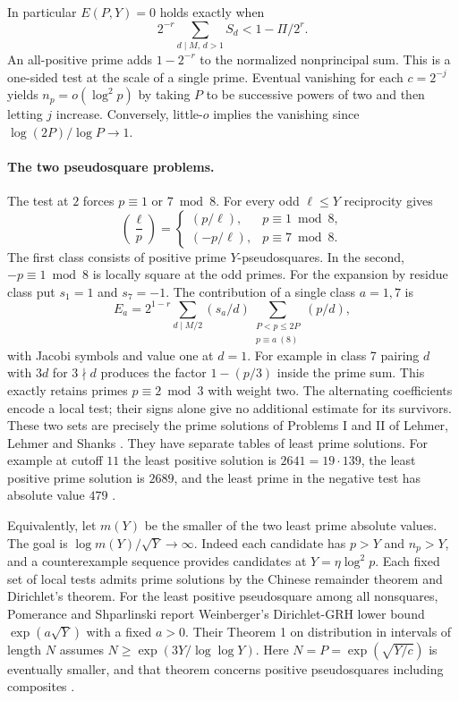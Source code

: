 \documentclass[11pt]{article}
\newcommand{\leg}[2]{\left(\frac{#1}{#2}\right)}
\begin{document}
In particular $E(P,Y)=0$ holds exactly when
\[
 2^{-r}\sum_{d\mid M,\,d>1} S_d < 1-\Pi/2^r .
 \tag{3}
\]
An all-positive prime adds $1-2^{-r}$ to the normalized nonprincipal
sum. This is a one-sided test at the scale of a single prime.
Eventual vanishing for each $c=2^{-j}$ yields $n_p=o(\log^2 p)$
by taking $P$ to be successive powers of two and then letting $j$
increase. Conversely, little-$o$ implies the vanishing since
$\log(2P)/\log P\to1$.

\paragraph{The two pseudosquare problems.}
The test at $2$ forces $p\equiv1$ or $7\bmod 8$. For every odd
$\ell\le Y$ reciprocity gives
\[
 \leg{\ell}{p}=\begin{cases}
 (p/\ell),&p\equiv1\bmod8,\\
 (-p/\ell),&p\equiv7\bmod8 .
 \end{cases}
\]
The first class consists of positive prime $Y$-pseudosquares. In
the second, $-p\equiv1\bmod8$ is locally square at the odd primes.
For the expansion by residue class put $s_1=1$ and $s_7=-1$.
The contribution of a single class $a=1,7$ is
\[
 E_a=2^{1-r}\sum_{d\mid M/2}(s_a/d)
             \sum_{\substack{P<p\le2P\\p\equiv a\ (8)}}(p/d),
 \tag{3a}
\]
with Jacobi symbols and value one at $d=1$. For example in class 7
pairing $d$ with $3d$ for $3\nmid d$ produces the factor $1-(p/3)$
inside the prime sum. This exactly retains primes $p\equiv2\bmod3$
with weight two. The alternating coefficients encode a local test;
their signs alone give no additional estimate for its survivors.
These two sets are precisely the prime solutions of Problems I and II of
Lehmer, Lehmer and Shanks \cite{lls}. They have separate tables of
least prime solutions. For example at cutoff $11$ the least positive
solution is $2641=19\cdot139$, the least positive prime solution is
$2689$, and the least prime in the negative test has absolute value
$479$ \cite[Tables 6.23 and 6.25]{lukes}.

Equivalently, let $m(Y)$ be the smaller of the two least prime absolute
values. The goal is $\log m(Y)/\sqrt Y\to\infty$. Indeed each candidate
has $p>Y$ and $n_p>Y$, and a counterexample sequence provides candidates
at $Y=\eta\log^2 p$. Each fixed set of local tests admits prime solutions
by the Chinese remainder theorem and Dirichlet's theorem.
For the least positive pseudosquare among all nonsquares,
Pomerance and Shparlinski report Weinberger's Dirichlet-GRH lower bound
$\exp(a\sqrt Y)$ with a fixed $a>0$. Their Theorem 1 on distribution
in intervals of length $N$ assumes $N\ge\exp(3Y/\log\log Y)$.
Here $N=P=\exp(\sqrt{Y/c})$ is eventually smaller, and that theorem
concerns positive pseudosquares including composites \cite{ps}.
\end{document}
